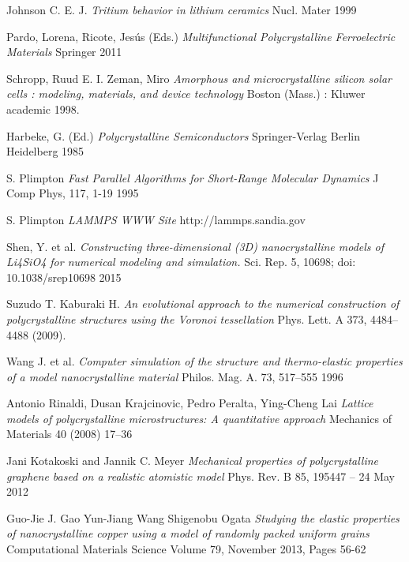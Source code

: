 \documentclass{article}
\begin{document}
\begin{thebibliography}{9}

  Johnson C. E. J.
  \textit{Tritium behavior in lithium ceramics}
  Nucl. Mater
  1999

  Pardo, Lorena, Ricote, Jesús (Eds.)
  \textit{Multifunctional Polycrystalline Ferroelectric Materials}
  Springer
  2011

  Schropp, Ruud E. I. Zeman, Miro
  \textit{Amorphous and microcrystalline silicon solar cells : modeling, materials, and device technology}
  Boston (Mass.) : Kluwer academic
  1998.

   Harbeke, G. (Ed.)
  \textit{Polycrystalline Semiconductors}
  Springer-Verlag Berlin Heidelberg
  1985

   S. Plimpton 
  \textit{Fast Parallel Algorithms for Short-Range Molecular Dynamics}
  J Comp Phys, 117, 1-19
  1995

   S. Plimpton 
  \textit{LAMMPS WWW Site}
  http://lammps.sandia.gov

  Shen, Y. et al. 
  \textit{Constructing three-dimensional (3D) nanocrystalline models of Li4SiO4 for numerical modeling and simulation.}
  Sci. Rep. 5, 10698; doi: 10.1038/srep10698 
  2015

  Suzudo T.  Kaburaki H. 
  \textit{An evolutional approach to the numerical construction of polycrystalline structures using the Voronoi tessellation}
  Phys. Lett. A 373, 4484–4488 (2009).

  Wang J. et al. 
  \textit{Computer simulation of the structure and thermo-elastic properties of a model nanocrystalline material}
  Philos. Mag. A. 73, 517–555 
  1996

  Antonio Rinaldi, Dusan Krajcinovic, Pedro Peralta, Ying-Cheng Lai
  \textit{Lattice models of polycrystalline microstructures: A quantitative approach}
  Mechanics of Materials 40 (2008) 17–36

  Jani Kotakoski and Jannik C. Meyer
  \textit{Mechanical properties of polycrystalline graphene based on a realistic atomistic model}
  Phys. Rev. B 85, 195447 – 24 May 2012

  Guo-Jie J. Gao  Yun-Jiang Wang Shigenobu Ogata
  \textit{Studying the elastic properties of nanocrystalline copper using a model of randomly packed uniform grains}
 Computational Materials Science
Volume 79, November 2013, Pages 56-62


\end{thebibliography}
\end{document}
